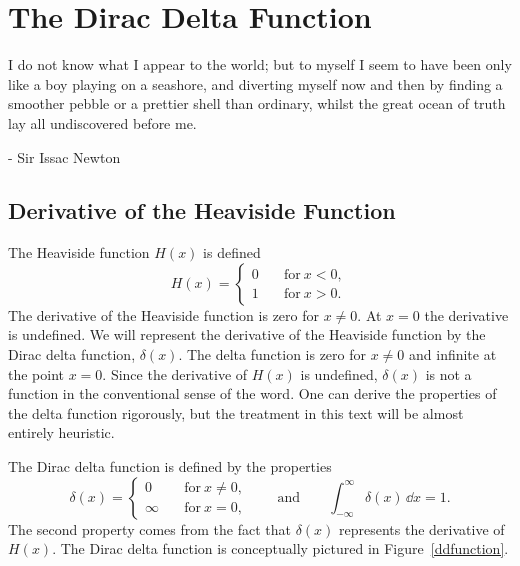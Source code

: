 \flushbottom


\chapter{The Dirac Delta Function}





I do not know what I appear to the world; but to myself I seem to have been 
only like a boy playing on a seashore, and diverting myself now and then by
finding a smoother pebble or a prettier shell than ordinary, 
whilst the great ocean of truth lay all undiscovered before me.

\begin{flushright}
  - Sir Issac Newton
\end{flushright}





\section{Derivative of the Heaviside Function}

The Heaviside function $H(x)$ is defined
\[ 
H(x) =       
\begin{cases}
  0 \quad &\mathrm{for}\ x < 0, \\
  1 \quad &\mathrm{for}\ x > 0.
\end{cases}
\]
The derivative of the Heaviside function is zero for $x \neq 0$.  At $x = 0$
the derivative is undefined.  
We will represent the derivative of the Heaviside function by the Dirac delta
function, $\delta(x)$.  The delta function is zero for $x \neq 0$ and 
infinite at the point $x = 0$.  Since the derivative of $H(x)$ is undefined,
$\delta(x)$ is not a function in the conventional sense of the word.  
One can derive the properties of the delta function rigorously, but the 
treatment in this text will be almost entirely heuristic.


The Dirac delta function is defined by the properties
\[ 
\delta(x) =      
\begin{cases}
  0 \quad &\mathrm{for}\ x \neq 0, \\
  \infty \quad &\mathrm{for}\ x = 0,
\end{cases}
\qquad \mathrm{and} \qquad
\int_{-\infty}^\infty \delta(x)\,\dd x = 1.
\]
The second property comes from the fact that $\delta(x)$ represents the 
derivative of $H(x)$.  
The Dirac delta function is conceptually pictured in Figure~\ref{ddfunction}.


